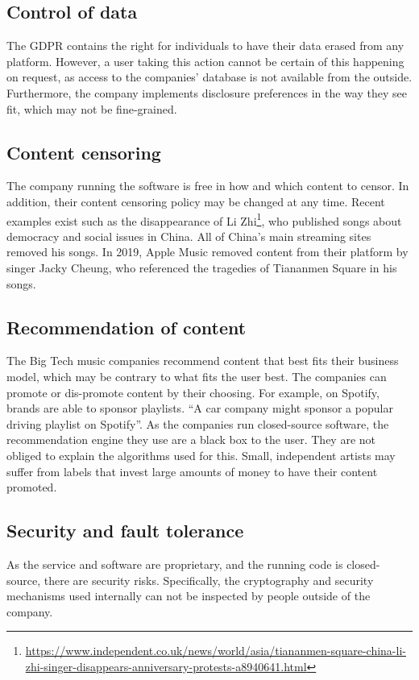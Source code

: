 \subsection{Control of data}
The GDPR contains the right for individuals to have their data erased from any platform. However, a user taking this action cannot be certain of this happening on request, as access to the companies' database is not available from the outside. Furthermore, the company implements disclosure preferences in the way they see fit, which may not be fine-grained. 
\subsection{Content censoring}
The company running the software is free in how and which content to censor. In addition, their content censoring policy may be changed at any time. Recent examples exist such as the disappearance of Li Zhi\footnote{\url{https://www.independent.co.uk/news/world/asia/tiananmen-square-china-li-zhi-singer-disappears-anniversary-protests-a8940641.html}}, who published songs about democracy and social issues in China. All of China's main streaming sites removed his songs. In 2019, Apple Music removed content from their platform by singer Jacky Cheung, who referenced the tragedies of Tiananmen Square in his songs.
\subsection{Recommendation of content}
The Big Tech music companies recommend content that best fits their business model, which may be contrary to what fits the user best. The companies can promote or dis-promote content by their choosing. For example, on Spotify, brands are able to sponsor playlists. ``A car company might sponsor a popular driving playlist on Spotify''\cite{prey2018nothing}. As the companies run closed-source software, the recommendation engine they use are a black box to the user. They are not obliged to explain the algorithms used for this. Small, independent artists may suffer from labels that invest large amounts of money to have their content promoted.
\subsection{Security and fault tolerance}
As the service and software are proprietary, and the running code is closed-source, there are security risks. Specifically, the cryptography and security mechanisms used internally can not be inspected by people outside of the company. 
